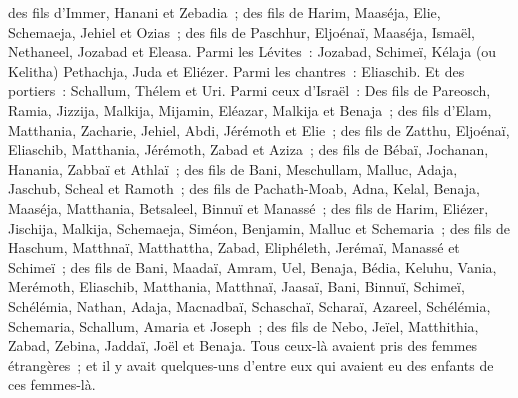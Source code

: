 \begin{multicols}{2}
des fils d'Immer, Hanani et Zebadia~;
des fils de Harim, Maaséja, Elie, Schemaeja, Jehiel et Ozias~;
des fils de Paschhur, Eljoénaï, Maaséja, Ismaël, Nethaneel, Jozabad et Eleasa.
Parmi les Lévites~: Jozabad, Schimeï, Kélaja (ou Kelitha) Pethachja, Juda et Eliézer.
Parmi les chantres~: Eliaschib. Et des portiers~: Schallum, Thélem et Uri.
Parmi ceux d'Israël~: Des fils de Pareosch, Ramia, Jizzija, Malkija, Mijamin, Eléazar, Malkija et Benaja~;
des fils d'Elam, Matthania, Zacharie, Jehiel, Abdi, Jérémoth et Elie~;
des fils de Zatthu, Eljoénaï, Eliaschib, Matthania, Jérémoth, Zabad et Aziza~;
des fils de Bébaï, Jochanan, Hanania, Zabbaï et Athlaï~;
des fils de Bani, Meschullam, Malluc, Adaja, Jaschub, Scheal et Ramoth~;
des fils de Pachath-Moab, Adna, Kelal, Benaja, Maaséja, Matthania, Betsaleel, Binnuï et Manassé~;
des fils de Harim, Eliézer, Jischija, Malkija, Schemaeja, Siméon,
Benjamin, Malluc et Schemaria~;
des fils de Haschum, Matthnaï, Matthattha, Zabad, Eliphéleth, Jerémaï, Manassé et Schimeï~;
des fils de Bani, Maadaï, Amram, Uel,
Benaja, Bédia, Keluhu,
Vania, Merémoth, Eliaschib,
Matthania, Matthnaï, Jaasaï,
Bani, Binnuï, Schimeï,
Schélémia, Nathan, Adaja,
Macnadbaï, Schaschaï, Scharaï,
Azareel, Schélémia, Schemaria,
Schallum, Amaria et Joseph~;
des fils de Nebo, Jeïel, Matthithia, Zabad, Zebina, Jaddaï, Joël et Benaja.
Tous ceux-là avaient pris des femmes étrangères~; et il y avait quelques-uns d'entre eux qui avaient eu des enfants de ces femmes-là.
\PPE{}
\end{multicols}
